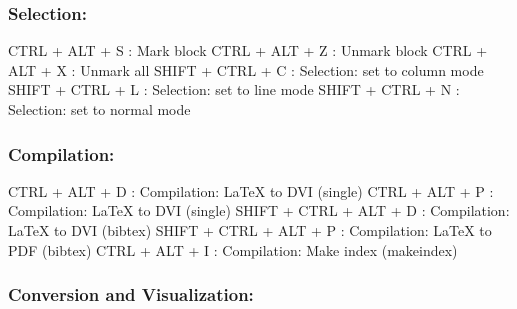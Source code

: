 \newpage
\subsubsection{Selection:}

\vspace{-0.5cm}
\begin{Rtables}[caption={[Selection keyboard shortcuts]
    Selection keyboard shortcuts},
  label=hotkey:selection]
  CTRL  + ALT  + S        : Mark block
  CTRL  + ALT  + Z        : Unmark block
  CTRL  + ALT  + X        : Unmark all
  SHIFT + CTRL + C        : Selection: set to column mode
  SHIFT + CTRL + L        : Selection: set to line mode
  SHIFT + CTRL + N        : Selection: set to normal mode
\end{Rtables}


\subsubsection{Compilation:}

\vspace{-0.5cm}
\begin{Rtables}[caption={[Compilation keyboard shortcuts]
    Compilation keyboard shortcuts},
  label=hotkey:compilation]
  CTRL  + ALT  + D       : Compilation: LaTeX to DVI (single)
  CTRL  + ALT  + P       : Compilation: LaTeX to DVI (single)
  SHIFT + CTRL + ALT + D : Compilation: LaTeX to DVI (bibtex)
  SHIFT + CTRL + ALT + P : Compilation: LaTeX to PDF (bibtex)
  CTRL  + ALT  + I       : Compilation: Make index (makeindex)
\end{Rtables}


\subsubsection{Conversion and Visualization:}

